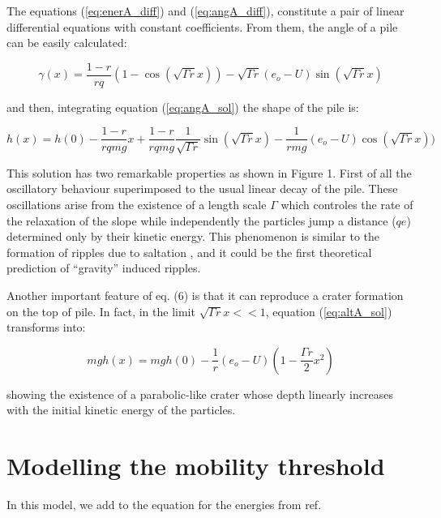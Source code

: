 The equations (\ref{eq:enerA_diff}) and (\ref{eq:angA_diff}),
constitute a pair of linear differential equations with constant 
coefficients. From them, the angle of a pile can be easily calculated:

\begin{equation}
\gamma(x)= \frac{1-r}{rq}(1-\cos(\sqrt{\Gamma r}x))-
                \sqrt{\Gamma r} (e_o-U)\sin(\sqrt{\Gamma r}x) 
                                \label{eq:angA_sol}
\end{equation}

\noindent and then, integrating equation (\ref{eq:angA_sol}) the shape of
the pile is:

\begin{equation}
h(x)=h(0) -\frac{1-r}{rqmg}x + \frac{1-r}{rqmg} 
                \frac{1}{\sqrt{\Gamma r}}\sin(\sqrt{\Gamma r}x)-
                \frac{1}{rmg}(e_o-U)\cos(\sqrt{\Gamma r}x)) 
                                \label{eq:altA_sol}
\end{equation}

This solution has two remarkable properties as shown in Figure 1. 
First of all  the
oscillatory behaviour superimposed to the usual linear decay of the
pile. These oscillations arise from the existence of a length scale $\Gamma$
which controles the rate of the relaxation of the slope while independently the particles jump a distance ($qe$) determined only by their kinetic energy. 
This phenomenon is similar to the formation of ripples due to
saltation \cite{Nishimori_97}, and it could be the first theoretical
prediction of ``gravity'' induced ripples.

Another important feature of eq. (6) is that it can reproduce a crater formation on the top of pile. In fact, in the limit $\sqrt{\Gamma r}x<<1$,
equation (\ref{eq:altA_sol}) transforms into:

\begin{equation}
mgh(x)=mgh(0)-\frac{1}{r}(e_o-U)(1-\frac{\Gamma r}{2} x^2) 
                                \label{eq:altA_sol_lim}
\end{equation}

\noindent showing the existence of a parabolic-like crater whose depth linearly increases with the initial kinetic energy of the particles.

\section{Modelling the mobility threshold}

In this model, we add to the equation for the energies
from ref.  \cite{Grasselli_98}

